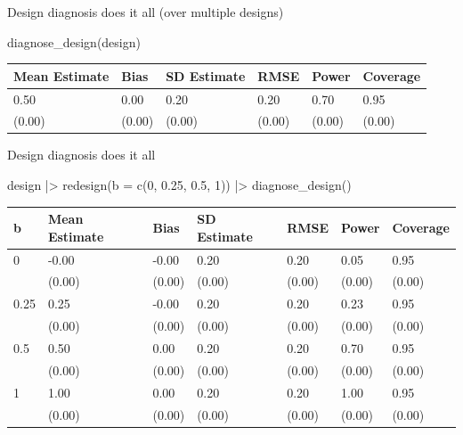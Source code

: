 \documentclass[
  11pt,
  ignorenonframetext,
]{beamer}
\newenvironment{Shaded}{\begin{snugshade}}{\end{snugshade}}
\newcommand{\AttributeTok}[1]{\textcolor[rgb]{0.40,0.45,0.13}{#1}}
\newcommand{\DecValTok}[1]{\textcolor[rgb]{0.68,0.00,0.00}{#1}}
\newcommand{\FloatTok}[1]{\textcolor[rgb]{0.68,0.00,0.00}{#1}}
\newcommand{\FunctionTok}[1]{\textcolor[rgb]{0.28,0.35,0.67}{#1}}
\newcommand{\NormalTok}[1]{\textcolor[rgb]{0.00,0.23,0.31}{#1}}
\newcommand{\SpecialCharTok}[1]{\textcolor[rgb]{0.37,0.37,0.37}{#1}}
\begin{document}
\begin{frame}[fragile]{Design diagnosis does it all (over multiple
designs)}
\protect\hypertarget{design-diagnosis-does-it-all-over-multiple-designs}{}
\begin{Shaded}
\begin{Highlighting}[]
  \FunctionTok{diagnose\_design}\NormalTok{(design)}
\end{Highlighting}
\end{Shaded}

\begin{tabular}{l|l|l|l|l|l}
\hline
Mean Estimate & Bias & SD Estimate & RMSE & Power & Coverage\\
\hline
0.50 & 0.00 & 0.20 & 0.20 & 0.70 & 0.95\\
\hline
(0.00) & (0.00) & (0.00) & (0.00) & (0.00) & (0.00)\\
\hline
\end{tabular}
\end{frame}

\begin{frame}[fragile]{Design diagnosis does it all}
\protect\hypertarget{design-diagnosis-does-it-all}{}
\begin{Shaded}
\begin{Highlighting}[]
\NormalTok{design }\SpecialCharTok{|\textgreater{}}
  \FunctionTok{redesign}\NormalTok{(}\AttributeTok{b =} \FunctionTok{c}\NormalTok{(}\DecValTok{0}\NormalTok{, }\FloatTok{0.25}\NormalTok{, }\FloatTok{0.5}\NormalTok{, }\DecValTok{1}\NormalTok{)) }\SpecialCharTok{|\textgreater{}}
  \FunctionTok{diagnose\_design}\NormalTok{()}
\end{Highlighting}
\end{Shaded}

\begin{tabular}{l|l|l|l|l|l|l}
\hline
b & Mean Estimate & Bias & SD Estimate & RMSE & Power & Coverage\\
\hline
0 & -0.00 & -0.00 & 0.20 & 0.20 & 0.05 & 0.95\\
\hline
 & (0.00) & (0.00) & (0.00) & (0.00) & (0.00) & (0.00)\\
\hline
0.25 & 0.25 & -0.00 & 0.20 & 0.20 & 0.23 & 0.95\\
\hline
 & (0.00) & (0.00) & (0.00) & (0.00) & (0.00) & (0.00)\\
\hline
0.5 & 0.50 & 0.00 & 0.20 & 0.20 & 0.70 & 0.95\\
\hline
 & (0.00) & (0.00) & (0.00) & (0.00) & (0.00) & (0.00)\\
\hline
1 & 1.00 & 0.00 & 0.20 & 0.20 & 1.00 & 0.95\\
\hline
 & (0.00) & (0.00) & (0.00) & (0.00) & (0.00) & (0.00)\\
\hline
\end{tabular}
\end{frame}
\end{document}
